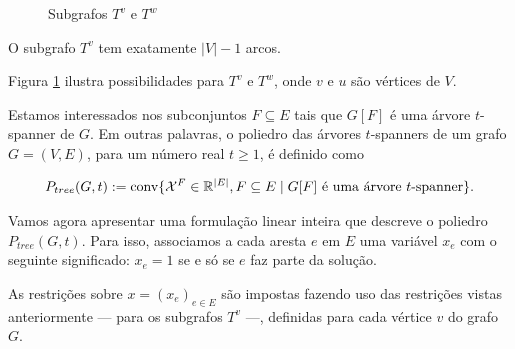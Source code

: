 \begin{figure}
\caption{Subgrafos $T^v$ e $T^w$}
\label{fig:arb_diferentes}
\end{figure}



\begin{fato}
  \label{afirm:num_arcos}
  O subgrafo $T^{v}$ tem exatamente $|V| - 1$ arcos.
\end{fato}
Figura \ref{fig:arb_diferentes} ilustra possibilidades
para $T^{v}$ e $T^{w}$, onde $v$ e $u$ são vértices de $V$. 

Estamos interessados nos subconjuntos $F \subseteq E$ tais
  que $G[F]$ é uma árvore $t$-spanner de $G$. Em outras palavras,
o poliedro das árvores $t$-spanners de um grafo $G=(V,E)$, para um número real $t \ge 1$, é
definido como

\begin{equation*}
\begin{split}
P_{tree}(G,t) :=  \text{conv}\{\mathcal{X}^{F} \in \mathbb{R}^{|E|}, F \subseteq E\; |\; \text{$G[F]$ é uma árvore $t$-spanner\}}. 
\end{split}
\end{equation*}

Vamos agora apresentar uma formulação linear inteira que descreve o
poliedro $P_{tree}(G,t)$.  Para isso, associamos a cada aresta $e$ em
$E$ uma variável $x_e$ com o seguinte significado: $x_e = 1$ se e só
se $e$ faz parte da solução.

As restrições sobre $x = (x_e)_{e \in E}$ são impostas fazendo uso das 
restrições vistas anteriormente --- para os subgrafos $T^v$ ---, definidas
para cada vértice $v$ do grafo $G$. 

